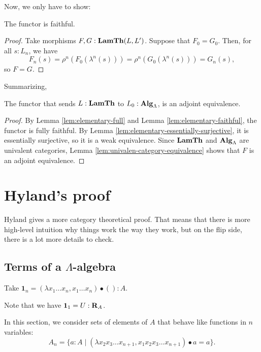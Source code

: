 Now, we only have to show:
\begin{lemma}\label{lem:elementary-faithful}
  The functor is faithful.
\end{lemma}
\begin{proof}
  Take morphisms $ F, G: \mathbf{LamTh}(L, L^\prime) $. Suppose that $ F_0 = G_0 $. Then, for all $ s: L_n $, we have
  \[ F_n(s) = \rho^n(F_0(\lambda^n(s))) = \rho^n(G_0(\lambda^n(s))) = G_n(s), \]
  so $ F = G $.
\end{proof}

Summarizing,
\begin{theorem}
  The functor that sends $ L : \mathbf{LamTh} $ to $ L_0 : \mathbf{Alg}_{\Lambda} $, is an adjoint equivalence.
\end{theorem}
\begin{proof}
  By Lemma \ref{lem:elementary-full} and Lemma \ref{lem:elementary-faithful}, the functor is fully faithful. By Lemma \ref{lem:elementary-essentially-surjective}, it is essentially surjective, so it is a weak equivalence. Since $ \mathbf{LamTh} $ and $ \mathbf{Alg}_{\Lambda} $ are univalent categories, Lemma \ref{lem:univalen-category-equivalence} shows that $ F $ is an adjoint equivalence.
\end{proof}

\section{Hyland's proof}

Hyland gives a more category theoretical proof. That means that there is more high-level intuition why things work the way they work, but on the flip side, there is a lot more details to check.

\subsection{Terms of a \texorpdfstring{$ \Lambda $}{Lambda}-algebra}

\begin{definition}
  Take $ \mathbf 1_n = (\lambda x_1 \dots x_n, x_1 \dots x_n) \bullet () : A $.
\end{definition}

\begin{remark}
  Note that we have $ \mathbf 1_1 = U : \mathbf{R}_A $.
\end{remark}

\begin{definition}
  In this section, we consider sets of elements of $ A $ that behave like functions in $ n $ variables:
  \[ A_n = \{ a : A \mid (\lambda x_2 x_3 \dots x_{n + 1}, x_1 x_2 x_3 \dots x_{n + 1}) \bullet a = a \}. \]
\end{definition}

